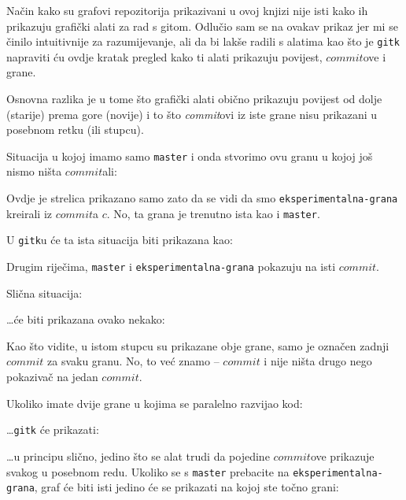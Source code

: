 
Način kako su grafovi repozitorija prikazivani u ovoj knjizi nije isti kako ih prikazuju grafički alati za rad s gitom.
Odlučio sam se na ovakav prikaz jer mi se činilo intuitivnije za razumijevanje, ali da bi lakše radili s alatima kao što je \verb+gitk+ napraviti ću ovdje kratak pregled kako ti alati prikazuju povijest, $commit$ove i grane.

Osnovna razlika je u tome što grafički alati obično prikazuju povijest od dolje (starije) prema gore (novije)
i to što \emph{commit}ovi iz iste grane nisu prikazani u posebnom retku (ili stupcu).


Situacija u kojoj imamo samo \verb+master+ i onda stvorimo ovu granu u kojoj još nismo ništa $commit$ali:



Ovdje je strelica prikazano samo zato da se vidi da smo \verb+eksperimentalna-grana+ kreirali iz $commit$a $c$.
No, ta grana je trenutno ista kao i \verb+master+.

U \verb+gitk+u će ta ista situacija biti prikazana kao:


Drugim riječima, \verb+master+ i \verb+eksperimentalna-grana+ pokazuju na isti $commit$.

Slična situacija:



\dots{}će biti prikazana ovako nekako:


Kao što vidite, u istom stupcu su prikazane obje grane, samo je označen zadnji $commit$ za svaku granu.
No, to već znamo -- $commit$ i nije ništa drugo nego pokazivač na jedan $commit$.

Ukoliko imate dvije grane u kojima se paralelno razvijao kod:



\dots{}\verb+gitk+ će prikazati:


\dots{}u principu slično, jedino što se alat trudi da pojedine $commit$ove prikazuje svakog u posebnom redu.
Ukoliko se s \verb+master+ prebacite na \verb+eksperimentalna-grana+, graf će biti isti jedino će se prikazati na kojoj ste točno grani:

